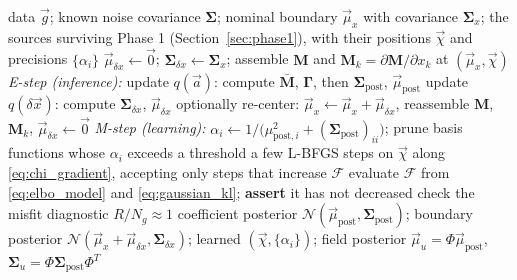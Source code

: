 \documentclass{article}
\begin{document}
\begin{algorithm}[t]
\caption{Phase 2 (move): variational evidence maximization for the sources surviving Phase 1 --- learning the source positions $\vec\chi$ and the prior $\{\alpha_i\}$, with known measurement noise covariance $\mathbf{\Sigma}$, and predicting the posterior of the coefficients $\vec a$.}
\label{alg:vem}
\begin{algorithmic}[1]
\Require data $\vec g$; known noise covariance $\mathbf{\Sigma}$; nominal boundary $\vec\mu_x$ with covariance $\mathbf{\Sigma}_x$; the sources surviving Phase 1 (Section~\ref{sec:phase1}), with their positions $\vec\chi$ and precisions $\{\alpha_i\}$
\State $\vec\mu_{\delta x}\gets\vec 0$; $\mathbf{\Sigma}_{\delta x}\gets\mathbf{\Sigma}_x$; assemble $\mathbf M$ and $\mathbf M_k = \partial\mathbf M/\partial x_k$ at $(\vec\mu_x, \vec\chi)$
\Repeat
    \State \emph{E-step (inference):}
    \State \quad update $q(\vec a)$: compute $\bar{\mathbf M}$, $\mathbf\Gamma$, then $\mathbf{\Sigma}_{\text{post}}$, $\vec\mu_{\text{post}}$ \Comment{\eqref{eq:Mbar}, \eqref{eq:Gamma}, \eqref{eq:vb_coefficient_update}}
    \State \quad update $q(\delta\vec x)$: compute $\mathbf{\Sigma}_{\delta x}$, $\vec\mu_{\delta x}$ \Comment{\eqref{eq:vb_boundary_precision}--\eqref{eq:vb_boundary_update}}
    \State \quad optionally re-center: $\vec\mu_x \gets \vec\mu_x + \vec\mu_{\delta x}$, reassemble $\mathbf M$, $\mathbf M_k$, $\vec\mu_{\delta x}\gets\vec 0$
    \State \emph{M-step (learning):}
    \State \quad $\alpha_i \gets 1/\big(\mu_{\text{post},i}^2 + (\mathbf{\Sigma}_{\text{post}})_{ii}\big)$; prune basis functions whose $\alpha_i$ exceeds a threshold \Comment{\eqref{eq:alpha_update}}
    \State \quad a few L-BFGS steps on $\vec\chi$ along \eqref{eq:chi_gradient}, accepting only steps that increase $\mathcal F$
    \State evaluate $\mathcal F$ from \eqref{eq:elbo_model} and \eqref{eq:gaussian_kl}; \textbf{assert} it has not decreased 
\State check the misfit diagnostic $R/N_g \approx 1$ 
\State \Return coefficient posterior $\mathcal N(\vec\mu_{\text{post}}, \mathbf{\Sigma}_{\text{post}})$; boundary posterior $\mathcal N(\vec\mu_x + \vec\mu_{\delta x}, \mathbf{\Sigma}_{\delta x})$; learned $(\vec\chi, \{\alpha_i\})$; field posterior $\vec\mu_u = \Phi\vec\mu_{\text{post}}$, $\mathbf{\Sigma}_u = \Phi\mathbf{\Sigma}_{\text{post}}\Phi^T$
\end{algorithmic}
\end{algorithm}
\end{document}
